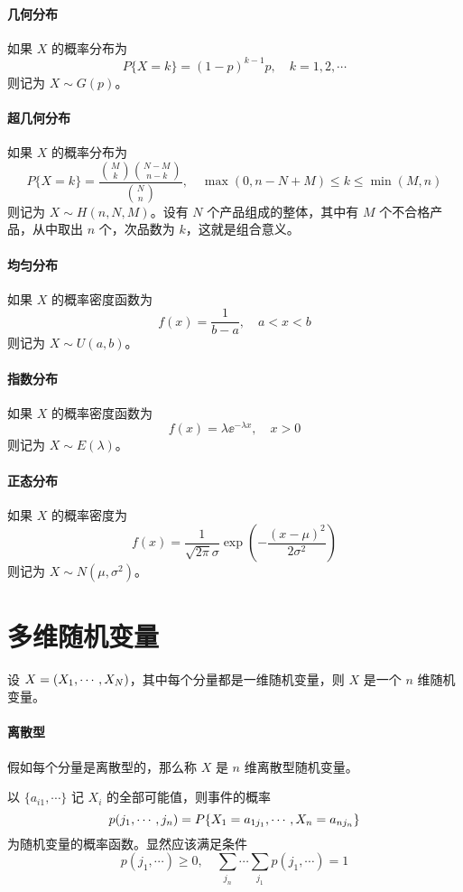 \paragraph{几何分布}
如果 $X$ 的概率分布为
\[ P\{X=k\} = (1 - p)^{k-1}p, \quad k = 1, 2, \cdots \]
则记为 $X \sim G(p)$。

\paragraph{超几何分布}
如果 $X$ 的概率分布为
\[ P\{X = k\} = \frac{\binom{M}{k} \binom{N - M}{n - k}}{\binom{N}{n}}, \quad \max(0, n - N + M) \leqslant k \leqslant \min(M, n) \]
则记为 $X \sim H(n, N, M)$。设有 $N$ 个产品组成的整体，其中有 $M$ 个不合格产品，从中取出 $n$ 个，次品数为 $k$，这就是组合意义。

\paragraph{均匀分布}
如果 $X$ 的概率密度函数为
\[ f(x) = \frac{1}{b - a}, \quad a < x < b \]
则记为 $X \sim U(a, b)$。

\paragraph{指数分布}
如果 $X$ 的概率密度函数为
\[ f(x) = \lambda \ee^{-\lambda x}, \quad x > 0 \]
则记为 $X \sim E(\lambda)$。

\paragraph{正态分布}
如果 $X$ 的概率密度为
\[ f(x) = \frac{1}{\sqrt{2 \pi}  \sigma} \exp \left(- \frac{(x - \mu)^2}{2\sigma^2}  \right) \]
则记为 $X \sim N(\mu, \sigma^2)$。

\section{多维随机变量}

设 $X = (X_1,\cdots,X_N)$，其中每个分量都是一维随机变量，则 $X$ 是一个 $n$ 维随机变量。

\paragraph{离散型}

假如每个分量是离散型的，那么称 $X$ 是 $n$ 维离散型随机变量。

\begin{definition}
	以 $\{a_{i1}, \cdots\}$ 记 $X_i$ 的全部可能值，则事件的概率
	\[ p(j_1,\cdots,j_n) = P\{X_1 = a_{1j_1}, \cdots, X_n = a_{n j_n}\} \]
	为随机变量的概率函数。显然应该满足条件
	\[ p(j_1, \cdots) \geqslant 0, \quad \sum_{j_n} \cdots \sum_{j_1} p(j_1, \cdots)  =1 \]
\end{definition}

